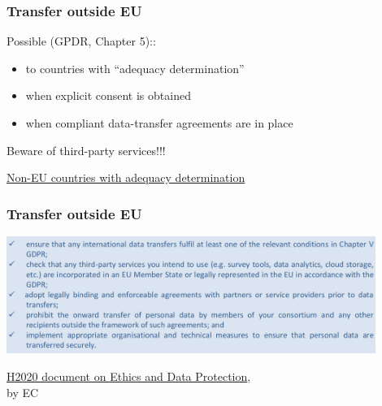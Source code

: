 \documentclass[17pt,aspectratio=169,hyperref={pdfusetitle,colorlinks,allcolors=olive}]{beamer}
\begin{document}
\begin{frame}[fragile]
  \frametitle{Transfer outside EU}

  Possible (GPDR, Chapter 5)::

  \begin{itemize}
  \item to countries with ``adequacy  determination''
  \item when explicit consent is obtained
  \item when compliant data-transfer agreements are in place
  \end{itemize}

  Beware of third-party services!!!
  
  \begin{flushright}
    \href{https://ec.europa.eu/info/law/law-topic/data-protection/international-dimension-data-protection/adequacy-decisions_en}{Non-EU countries with adequacy determination}
  \end{flushright}
 
\end{frame}

\begin{frame}[fragile]
  \frametitle{Transfer outside EU}

  \begin{center}
  \includegraphics[width=12cm]{figs/gdpr-intl-transfers}
  \end{center}  
  
  {\footnotesize
    \begin{flushright}
    \href{https://ec.europa.eu/research/participants/data/ref/h2020/grants_manual/hi/ethics/h2020_hi_ethics-data-protection_en.pdf}{H2020 document on Ethics and Data Protection}, \\ by EC
  \end{flushright}
  }
 
\end{frame}
\end{document}
